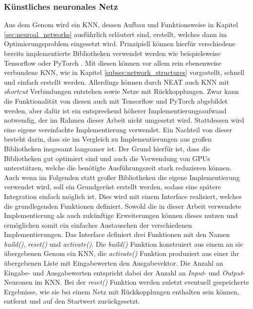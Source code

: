 \subsubsection{Künstliches neuronales Netz}
Aus dem Genom wird ein \ac{KNN}, dessen Aufbau und Funktionsweise in Kapitel \ref{sec:neuroal_networks} ausführlich erläutert sind, erstellt, welches dann im Optimierungsproblem eingesetzt wird. Prinzipiell können hierfür verschiedene bereits implementierte Bibliotheken verwendet werden wie beispielsweise Tensorflow \cite{tensorflow2015} oder PyTorch \cite{pytorch2019}. Mit diesen können vor allem rein ebenenweise verbundene \ac{KNN}, wie in Kapitel \ref{subsec:network_structures} vorgestellt, schnell und einfach erstellt werden. Allerdings können durch \ac{NEAT} auch \ac{KNN} mit \emph{shortcut} Verbindungen entstehen sowie Netze mit Rückkopplungen. Zwar kann die Funktionalität von diesen auch mit Tensorflow und PyTorch abgebildet werden, aber dafür ist ein entsprechend höherer Implementierungsaufwand notwendig, der im Rahmen dieser Arbeit nicht umgesetzt wird. Stattdessen wird eine eigene vereinfachte Implementierung verwendet. Ein Nachteil von dieser besteht darin, dass sie im Vergleich zu Implementierungen aus großen Bibliotheken insgesamt langsamer ist. Der Grund hierfür ist, dass die Bibliotheken gut optimiert sind und auch die Verwendung von \acp{GPU} unterstützen, welche die benötigte Ausführungszeit stark reduzieren können. Auch wenn im Folgenden statt großer Bibliotheken die eigene Implementierung verwendet wird, soll ein Grundgerüst erstellt werden, sodass eine spätere Integration einfach möglich ist. Dies wird mit einem Interface realisiert, welches die grundlegenden Funktionen definiert. Sowohl die in dieser Arbeit verwendete Implementierung als auch zukünftige Erweiterungen können dieses nutzen und ermöglichen somit ein einfaches Austauschen der verschiedenen Implementierungen. Das Interface definiert drei Funktionen mit den Namen \emph{build()}, \emph{reset()} und \emph{activate()}. Die \emph{build()} Funktion konstruiert aus einem an sie übergebenen Genom ein \ac{KNN}, die \emph{activate()} Funktion produziert aus einer ihr übergebenen Liste mit Eingabewerten den Ausgabevektor. Die Anzahl an Eingabe- und Ausgabewerten entspricht dabei der Anzahl an \emph{Input}- und \emph{Output}-Neuronen im \ac{KNN}. Bei der \emph{reset()} Funktion werden zuletzt eventuell gespeicherte Ergebnisse, wie sie bei einem Netz mit Rückkopplungen enthalten sein können, entfernt und auf den Startwert zurückgesetzt. 
\\\\
